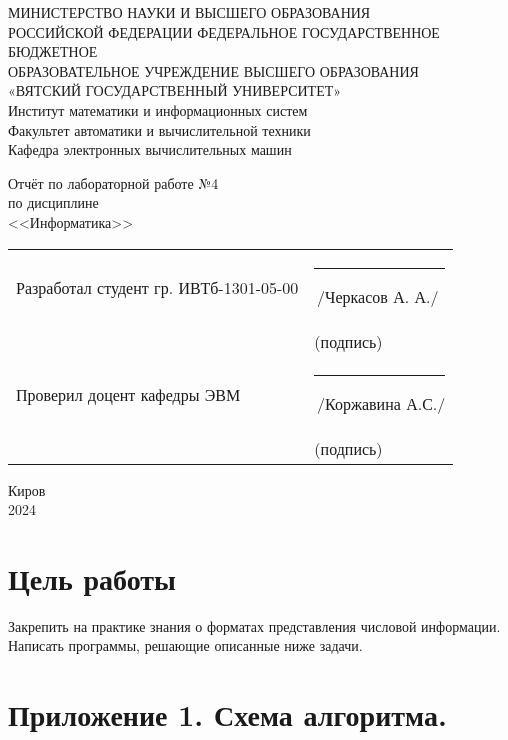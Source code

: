 \documentclass[oneside,a4paper,14pt]{extarticle}
\begin{document}
\newpage
\thispagestyle{empty}
\begin{center}
	МИНИСТЕРСТВО НАУКИ И ВЫСШЕГО ОБРАЗОВАНИЯ\\
	РОССИЙСКОЙ ФЕДЕРАЦИИ
	ФЕДЕРАЛЬНОЕ ГОСУДАРСТВЕННОЕ БЮДЖЕТНОЕ\\
	ОБРАЗОВАТЕЛЬНОЕ
	УЧРЕЖДЕНИЕ ВЫСШЕГО ОБРАЗОВАНИЯ\\
	«ВЯТСКИЙ ГОСУДАРСТВЕННЫЙ УНИВЕРСИТЕТ»\\
	Институт математики и информационных систем\\
	Факультет автоматики и вычислительной техники\\
	Кафедра электронных вычислительных машин
\end{center}
\vspace{20mm}

\begin{center}
	Отчёт по лабораторной работе №4\\
	по дисциплине\\
	<<Информатика>>\\
\end{center}
\vspace{40mm}
\noindent
  \begin{tabular}{ll}
    Разработал студент гр. ИВТб-1301-05-00 & \rule[-1mm]{30mm}{0.10mm}\,/Черкасов А. А./\\
    & \hspace{8mm}\footnotesize(подпись)\\
     
    Проверил доцент кафедры ЭВМ & \rule[-1mm]{30mm}{0.10mm}\,/Коржавина А.С./\\
    & \hspace{8mm}\footnotesize(подпись)\\
  \end{tabular}

\vfill
\begin{center}
	Киров\\
	2024
\end{center}

\newpage\thispagestyle{plain}
\section*{Цель работы}
Закрепить на практике знания о форматах представления числовой информации. Написать программы, решающие описанные ниже задачи.

\section*{Приложение 1. Схема алгоритма.}
\begin{figure}[h!]
	\centering
	
\end{figure}
\end{document}
